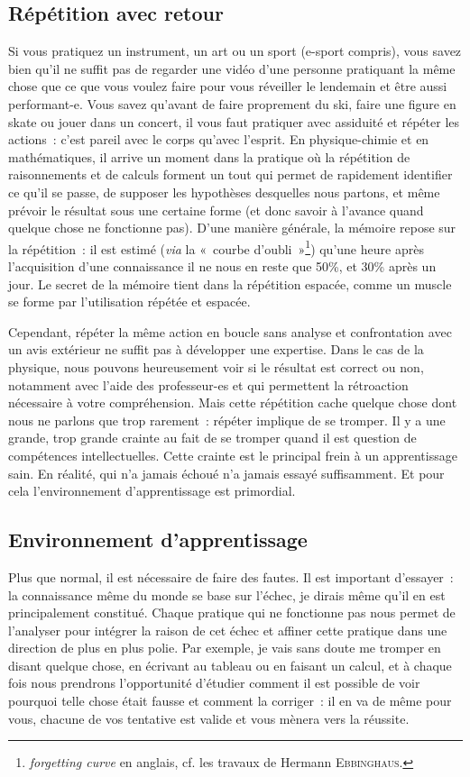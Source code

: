 \documentclass[a4paper, 10pt, final, garamond]{book}
\begin{document}
\subsection{Répétition avec retour}

Si vous pratiquez un instrument, un art ou un sport (e-sport compris), vous
savez bien qu'il ne suffit pas de regarder une vidéo d'une personne pratiquant
la même chose que ce que vous voulez faire pour vous réveiller le lendemain et
être aussi performant-e. Vous savez qu'avant de faire proprement du ski, faire
une figure en skate ou jouer dans un concert, il vous faut pratiquer avec
assiduité et répéter les actions~: c'est pareil avec le corps qu'avec l'esprit.
En physique-chimie et en mathématiques, il arrive un moment dans la pratique où
la répétition de raisonnements et de calculs forment un tout qui permet de
rapidement identifier ce qu'il se passe, de supposer les hypothèses desquelles
nous partons, et même prévoir le résultat sous une certaine forme (et donc
savoir à l'avance quand quelque chose ne fonctionne pas). D'une manière
générale, la mémoire repose sur la répétition~: il est estimé (\textit{via} la
«~courbe d'oubli~»\footnote{\textit{forgetting curve} en anglais, cf. les
	travaux de Hermann \textsc{Ebbinghaus}.}) qu'une heure après l'acquisition
d'une connaissance il ne nous en reste que 50\%, et 30\% après un jour. Le
secret de la mémoire tient dans la répétition espacée, comme un muscle se forme
par l'utilisation répétée et espacée.

Cependant, répéter la même action en boucle sans analyse et confrontation avec
un avis extérieur ne suffit pas à développer une expertise. Dans le cas de la
physique, nous pouvons heureusement voir si le résultat est correct ou non,
notamment avec l'aide des professeur-es et qui permettent la rétroaction
nécessaire à votre compréhension. Mais cette répétition cache quelque chose dont
nous ne parlons que trop rarement~: répéter implique de se tromper. Il y a une
grande, trop grande crainte au fait de se tromper quand il est question de
compétences intellectuelles. Cette crainte est le principal frein à un
apprentissage sain. En réalité, qui n'a jamais échoué n'a jamais essayé
suffisamment. Et pour cela l'environnement d'apprentissage est primordial.

\subsection{Environnement d'apprentissage}

Plus que normal, il est nécessaire de faire des fautes. Il est important
d'essayer~: la connaissance même du monde se base sur l'échec, je dirais même
qu'il en est principalement constitué. Chaque pratique qui ne fonctionne pas
nous permet de l'analyser pour intégrer la raison de cet échec et affiner cette
pratique dans une direction de plus en plus polie. Par exemple, je vais sans
doute me tromper en disant quelque chose, en écrivant au tableau ou en faisant
un calcul, et à chaque fois nous prendrons l'opportunité d'étudier comment il
est possible de voir pourquoi telle chose était fausse et comment la corriger~:
il en va de même pour vous, chacune de vos tentative est valide et vous mènera
vers la réussite.
\end{document}

